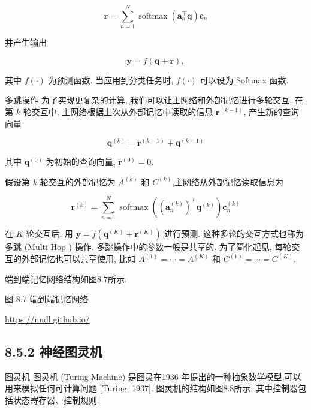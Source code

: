 \documentclass[10pt]{article}
\begin{document}
\begin{equation*}
\boldsymbol{r}=\sum_{n=1}^{N} \operatorname{softmax}\left(\boldsymbol{a}_{n}^{\top} \boldsymbol{q}\right) \boldsymbol{c}_{n} \tag{8.25}
\end{equation*}


并产生输出


\begin{equation*}
\boldsymbol{y}=f(\boldsymbol{q}+\boldsymbol{r}), \tag{8.26}
\end{equation*}


其中 $f(\cdot)$ 为预测函数. 当应用到分类任务时, $f(\cdot)$ 可以设为 Softmax 函数.

多跳操作 为了实现更复杂的计算, 我们可以让主网络和外部记忆进行多轮交互. 在第 $k$ 轮交互中, 主网络根据上次从外部记忆中读取的信息 $\boldsymbol{r}^{(k-1)}$, 产生新的查询向量


\begin{equation*}
\boldsymbol{q}^{(k)}=\boldsymbol{r}^{(k-1)}+\boldsymbol{q}^{(k-1)} \tag{8.27}
\end{equation*}


其中 $\boldsymbol{q}^{(0)}$ 为初始的查询向量, $\boldsymbol{r}^{(0)}=0$.

假设第 $k$ 轮交互的外部记忆为 $A^{(k)}$ 和 $C^{(k)}$,主网络从外部记忆读取信息为


\begin{equation*}
\boldsymbol{r}^{(k)}=\sum_{n=1}^{N} \operatorname{softmax}\left(\left(\boldsymbol{a}_{n}^{(k)}\right)^{\top} \boldsymbol{q}^{(k)}\right) \boldsymbol{c}_{n}^{(k)} \tag{8.28}
\end{equation*}


在 $K$ 轮交互后, 用 $\boldsymbol{y}=f\left(\boldsymbol{q}^{(K)}+\boldsymbol{r}^{(K)}\right)$ 进行预测. 这种多轮的交互方式也称为多跳 (Multi-Hop ) 操作. 多跳操作中的参数一般是共享的. 为了简化起见, 每轮交互的外部记忆也可以共享使用, 比如 $A^{(1)}=\cdots=A^{(K)}$ 和 $C^{(1)}=\cdots=C^{(K)}$.

端到端记忆网络结构如图8.7所示.



图 8.7 端到端记忆网络

\href{https://nndl.github.io/}{https://nndl.github.io/}

\subsection*{8.5.2 神经图灵机}
图灵机 图灵机 (Turing Machine) 是图灵在1936 年提出的一种抽象数学模型,可以用来模拟任何可计算问题 [Turing, 1937]. 图灵机的结构如图8.8所示, 其中控制器包括状态寄存器、控制规则.
\end{document}
